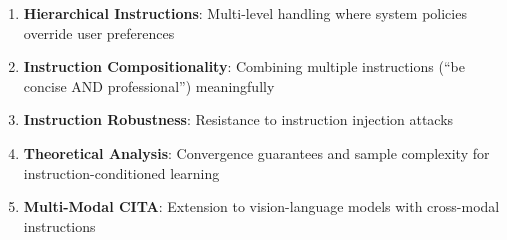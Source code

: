 \begin{enumerate}[leftmargin=*,itemsep=2pt]
    \item \textbf{Hierarchical Instructions}: Multi-level handling where system policies override user preferences

    \item \textbf{Instruction Compositionality}: Combining multiple instructions (``be concise AND professional'') meaningfully

    \item \textbf{Instruction Robustness}: Resistance to instruction injection attacks

    \item \textbf{Theoretical Analysis}: Convergence guarantees and sample complexity for instruction-conditioned learning

    \item \textbf{Multi-Modal CITA}: Extension to vision-language models with cross-modal instructions
\end{enumerate}
